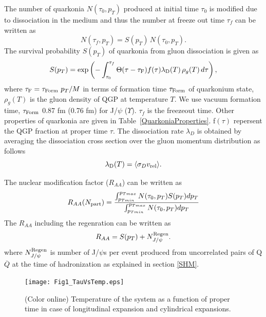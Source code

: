 \documentclass[aps,prc,preprint,superscriptaddress,showpacs,showkeys]{revtex4-1}
\begin{document}
  The number of quarkonia $N(\tau_0,p_T)$ produced at initial time $\tau_0$ is modified due to 
dissociation in the medium and thus the number at freeze out time $\tau_f$ can be written as  
\begin{equation}
N(\tau_f,p_T) = S(p_T) \,N(\tau_0,p_T).
\label{eqbeta}
\end{equation}
The survival probability $S(p_T)$ of quarkonia from gluon dissociation is given as 
\begin{equation}
S(p_T) = \exp \left( {-\int_{\tau_0}^{\tau_f}\Theta(\tau-\tau_{\rm{F}})f(\tau)\lambda_{\rm D}(T)\,\rho_g(T)\,d\tau} \right), 
\end{equation}
where $\tau_{\rm{F}} = \tau_{\rm Form~}p_T/M$ in terms of formation time $\tau_{\rm Form}$
of quarkonium state, $\rho_g(T)$ is the gluon density of QGP at temperature $T$.
 We use vacuum formation time, $\tau_{\rm Form}$ 0.87 fm (0.76 fm) for J/$\psi$ ($\Upsilon$)\cite{YSuppAbdShuk}.     
$\tau_f$ is the freezeout time. Other properties of quarkonia are given in Table~\ref{QuarkoniaProperties}.
f$(\tau)$ repersent the QGP fraction at proper time $\tau$.  
The dissociation rate $\lambda_D$ is obtained by averaging the dissociation cross section over the 
gluon momentum distribution as follows
\begin{equation}
\lambda_{\rm D}(T)=\langle \sigma_D v_{\mathrm{rel}} \rangle.
\label{LamdaDRhod}
\end{equation}


  The nuclear modification factor ($R_{AA}$) can be written as 
\begin{equation}
R_{AA}(N_{\rm part}) = \frac{\int_{p_{Tmin}}^{p_{Tmax}} N(\tau_0,p_T)S(p_T)dp_T}{\int_{p_{Tmin}}^{p_{Tmax}} N(\tau_0,p_T) dp_T}
\label{raa}
\end{equation}
 The $R_{AA}$ including the regenration can be written as 
\begin{equation}
R_{AA} = S(p_T) + N_{J/\psi}^{\rm Regen}.
\end{equation}
where $N_{J/\psi}^{\rm Regen}$ is number of J/$\psi$s per event produced from uncorrelated pairs of 
Q$\overline{Q}$ at the time of hadronization as explained in section \ref{SHM}. 

\begin{figure}
\texttt{[image: Fig1\_TauVsTemp.eps]}
\caption{(Color online) Temperature of the system as a function of proper time in case of 
longitudinal expansion and cylindrical expansions.}
\label{fig:TauVsTemp}
\end{figure}
\end{document}
